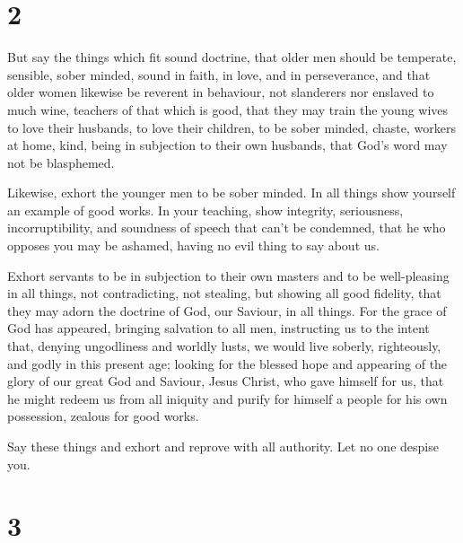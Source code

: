 \hypertarget{section-1}{%
\section{2}\label{section-1}}

 But say the things which fit sound doctrine, 
that older men should be temperate, sensible, sober minded, sound in
faith, in love, and in perseverance,  and that older women
likewise be reverent in behaviour, not slanderers nor enslaved to much
wine, teachers of that which is good,  that they may train
the young wives to love their husbands, to love their children,
 to be sober minded, chaste, workers at home, kind, being in
subjection to their own husbands, that God's word may not be blasphemed.

 Likewise, exhort the younger men to be sober minded.
 In all things show yourself an example of good works. In
your teaching, show integrity, seriousness, incorruptibility,
 and soundness of speech that can't be condemned, that he
who opposes you may be ashamed, having no evil thing to say about us.

 Exhort servants to be in subjection to their own masters
and to be well-pleasing in all things, not contradicting, 
not stealing, but showing all good fidelity, that they may adorn the
doctrine of God, our Saviour, in all things.  For the grace
of God has appeared, bringing salvation to all men, 
instructing us to the intent that, denying ungodliness and worldly
lusts, we would live soberly, righteously, and godly in this present
age;  looking for the blessed hope and appearing of the
glory of our great God and Saviour, Jesus Christ,  who gave
himself for us, that he might redeem us from all iniquity and purify for
himself a people for his own possession, zealous for good works.

 Say these things and exhort and reprove with all
authority. Let no one despise you.

\hypertarget{section-2}{%
\section{3}\label{section-2}}

